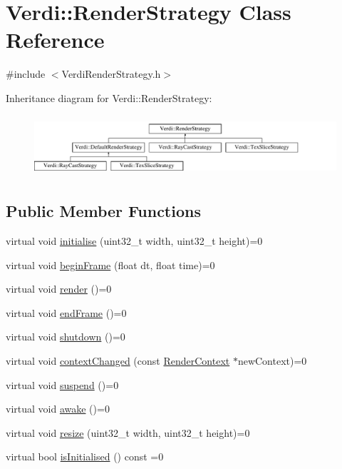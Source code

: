 \hypertarget{class_verdi_1_1_render_strategy}{\section{\-Verdi\-:\-:\-Render\-Strategy \-Class \-Reference}
\label{class_verdi_1_1_render_strategy}
}


{\ttfamily \#include $<$\-Verdi\-Render\-Strategy.\-h$>$}

\-Inheritance diagram for \-Verdi\-:\-:\-Render\-Strategy\-:\begin{figure}[H]
\begin{center}
\leavevmode
\includegraphics[height=2.270270cm]{class_verdi_1_1_render_strategy}
\end{center}
\end{figure}
\subsection*{\-Public \-Member \-Functions}
\begin{DoxyCompactItemize}
\item 
virtual void \hyperlink{class_verdi_1_1_render_strategy_a300417f6a6cc08f1bb6e609475dbf638}{initialise} (uint32\-\_\-t width, uint32\-\_\-t height)=0
\item 
virtual void \hyperlink{class_verdi_1_1_render_strategy_a7b968d3bcbc2b791e5593f639b0af527}{begin\-Frame} (float dt, float time)=0
\item 
virtual void \hyperlink{class_verdi_1_1_render_strategy_a722068356fab14b78f8104614b6bb39a}{render} ()=0
\item 
virtual void \hyperlink{class_verdi_1_1_render_strategy_a944fdbb328fd38f40f227ce1ecc9fd7f}{end\-Frame} ()=0
\item 
virtual void \hyperlink{class_verdi_1_1_render_strategy_ab4b85d09886b1adc6a32f638522684cc}{shutdown} ()=0
\item 
virtual void \hyperlink{class_verdi_1_1_render_strategy_abdd27f6e043ad468307bcc6b5e85356f}{context\-Changed} (const \hyperlink{class_verdi_1_1_render_context}{\-Render\-Context} $\ast$new\-Context)=0
\item 
virtual void \hyperlink{class_verdi_1_1_render_strategy_a0e46a0f8434b471bf8b0c1c9b243e6d5}{suspend} ()=0
\item 
virtual void \hyperlink{class_verdi_1_1_render_strategy_a34797cbcea846c22a23937226281922b}{awake} ()=0
\item 
virtual void \hyperlink{class_verdi_1_1_render_strategy_aa6290274c5e5e914c2a50347b125dff5}{resize} (uint32\-\_\-t width, uint32\-\_\-t height)=0
\item 
virtual bool \hyperlink{class_verdi_1_1_render_strategy_afe668a16ada4c12b7c58b0952cb3dffa}{is\-Initialised} () const =0
\end{DoxyCompactItemize}


